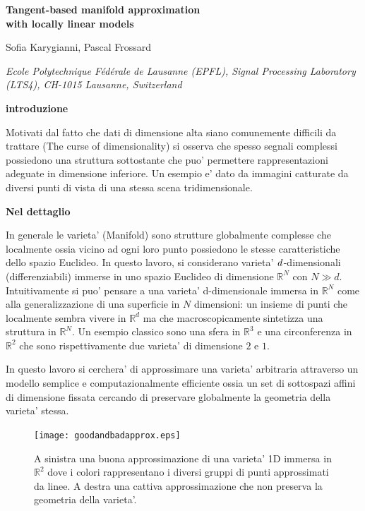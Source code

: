 \documentclass[a4, landscape]{seminar}
\theoremstyle{definition}
\newcommand{\RR}{\mathbb{R}}
\def\bc{\begin{center}}
\def\ec{\end{center}}
\def\bs{\begin{slide}\begingroup\small}
\def\es{\endgroup\end{slide}}
\begin{document}
\large

\bs
\bc{\bf\color{blue}Tangent-based manifold approximation \\with locally linear models}\ec

\vskip 0.2in

\bc{{\color{red} Sofia Karygianni, Pascal Frossard}}\ec

\vskip 0.2in

\bc{\footnotesize \it Ecole Polytechnique Fédérale de Lausanne (EPFL), Signal Processing Laboratory (LTS4), CH-1015 Lausanne, Switzerland}\ec
\es

\bs
\bc{\bf\color{blue}introduzione}\ec
Motivati dal fatto che dati di dimensione alta siano comunemente difficili da trattare (The curse of dimensionality) si osserva che spesso segnali complessi possiedono una struttura sottostante che puo' permettere rappresentazioni adeguate in dimensione inferiore.
\vskip 0.2in
Un esempio e' dato da immagini catturate da diversi punti di vista di una stessa scena tridimensionale.
\es

\bs
\bc{\bf\color{blue}Nel dettaglio}\ec
In generale le varieta' (Manifold) sono strutture globalmente complesse che localmente ossia vicino ad ogni loro punto possiedono le stesse caratteristiche dello spazio Euclideo. In questo lavoro, si considerano varieta' $\it d$-dimensionali (differenziabili) immerse in uno spazio Euclideo di dimensione $\RR^{N}$ con $N \gg d$.
	Intuitivamente si puo' pensare a una varieta' d-dimensionale immersa in $\RR^{N}$ come alla generalizzazione di una superficie in $N$ dimensioni: un insieme di punti che localmente sembra vivere in $\RR^{d}$ ma che macroscopicamente sintetizza una struttura in $\RR^{N}$.
\vskip 0.2in
Un esempio classico sono una sfera in $\RR^{3}$ e una circonferenza in $\RR^{2}$ che sono rispettivamente due varieta' di dimensione $2$ e $1$.
\es

\bs
In questo lavoro si cerchera' di approssimare una varieta' arbitraria attraverso un modello semplice e computazionalmente efficiente ossia un set di sottospazi affini di dimensione fissata cercando di preservare globalmente la geometria della varieta' stessa.


\begin{figure}[b]
\centering
\texttt{[image: goodandbadapprox.eps]}
\caption{A sinistra una buona approssimazione di una varieta' 1D immersa in $\RR^{2}$ dove i colori rappresentano i diversi gruppi di punti approssimati da linee. A destra una cattiva approssimazione che non preserva la geometria della varieta'.}
\end{figure}
\es
\end{document}
